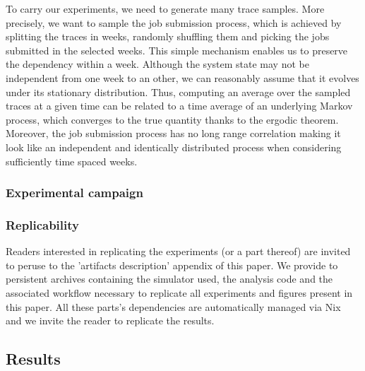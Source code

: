 \documentclass[sigconf]{acmart}
\begin{document}

To carry our experiments, we need to generate many trace samples. More precisely, we want
to sample the job submission process, which is achieved by splitting the traces in weeks,
randomly shuffling them and picking the jobs submitted in the selected weeks.  This simple
mechanism enables us to preserve the dependency within a week. Although the system state
may not be independent from one week to an other, we can reasonably assume that it evolves
under its stationary distribution. Thus, computing an average over the sampled traces at a
given time can be related to a time average of an underlying Markov process, which
converges to the true quantity thanks to the ergodic theorem.  Moreover, the job
submission process has no long range correlation making it look like an independent and
identically distributed process when considering sufficiently time spaced weeks.

\subsubsection{Experimental campaign}


\subsubsection{Replicability}

Readers interested in replicating the experiments (or a part thereof) are
invited to peruse to the 'artifacts description' appendix of this paper.  We
provide to persistent archives containing the simulator used, the analysis code
and the associated workflow necessary to replicate all experiments and figures
present in this paper. All these parts's dependencies are automatically managed
via Nix~\cite{nix} and we invite the reader to replicate the results.

\subsection{Results}
\label{sub:results}
\end{document}
